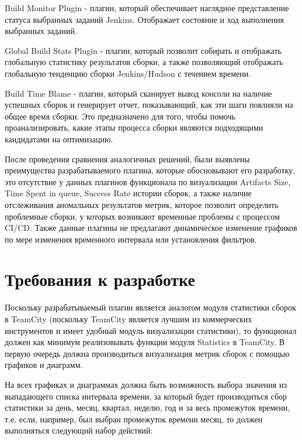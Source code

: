  Build Monitor Plugin - плагин, который обеспечивает наглядное представление статуса выбранных заданий Jenkins. Отображает состояние и ход выполнения выбранных заданий.
 
 Global Build Stats Plugin - плагин, который позволит собирать и отображать глобальную статистику результатов сборки, а также позволяющий отображать глобальную тенденцию сборки Jenkins/Hudson с течением времени.
 
  Build Time Blame - плагин, который сканирует вывод консоли на наличие успешных сборок и генерирует отчет, показывающий, как эти шаги повлияли на общее время сборки. Это предназначено для того, чтобы помочь проанализировать, какие этапы процесса сборки являются подходящими кандидатами на оптимизацию.
  
  После проведения сравнения аналогичных решений, были выявлены преимущества разрабатываемого плагина, которые обосновывают его разработку, это отсутствие у данных плагинов функционала по визуализации Artifacts Size, Time Spent in queue, Success Rate истории сборок, а также наличие отслеживания аномальных результатов метрик, которое позволит определить проблемные сборки, у которых возникают временные проблемы с процессом CI/CD. Также данные плагины не предлагают динамическое изменение графиков по мере изменения временного интервала или установления фильтров.



\section{Требования к разработке} \label{ch1:sec6}

Поскольку разрабатываемый плагин является аналогом модуля статистики сборок в TeamCity (поскольку TeamCity является лучшим из коммерческих инструментов и имеет удобный модуль визуализации статистики), то функционал должен как минимум реализовывать функции модуля Statistics в TeamCity. В первую очередь должна производиться визуализация метрик сборок с помощью графиков и диаграмм.

На всех графиках и диаграммах должна быть возможность выбора значения из выпадающего списка интервала времени, за который будет производиться сбор статистики за день, месяц, квартал, неделю, год и за весь промежуток времени, т.е. если, например, был выбран промежуток времени месяц, то должен выполняться следующий набор действий:

